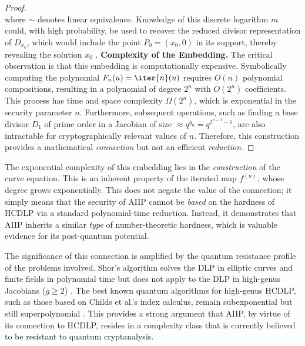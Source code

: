 \begin{proof}
\begin{equation}
                    \end{equation}
                    where \( \sim \) denotes linear equivalence. Knowledge of this discrete logarithm \( m \) could, with high probability, be used to recover the reduced divisor representation of \( D_{x_0} \), which would include the point \( P_0 = (x_0, 0) \) in its support, thereby revealing the solution \( x_0 \) \cite[Section 14.2]{Cohen2010}.
                \textbf{Complexity of the Embedding.}
                    The critical observation is that this embedding is computationally expensive. Symbolically computing the polynomial \( F_n(u) = \iter{n}(u) \) requires \( O(n) \) polynomial compositions, resulting in a polynomial of degree \( 2^n \) with \( O(2^n) \) coefficients. This process has time and space complexity \( \Omega(2^n) \), which is exponential in the security parameter \( n \). Furthermore, subsequent operations, such as finding a base divisor \( D_1 \) of prime order in a Jacobian of size \( \approx q^{g_n} = q^{2^{n-1}-1} \), are also intractable for cryptographically relevant values of \( n \). Therefore, this construction provides a mathematical \emph{connection} but not an efficient \emph{reduction}.
            \end{proof}
            \begin{remark}\label{rm:complexity-remark}
                The exponential complexity of this embedding lies in the \emph{construction} of the curve equation. This is an inherent property of the iterated map \( f^{(n)} \), whose degree grows exponentially. This does not negate the value of the connection; it simply means that the security of AIIP cannot be \emph{based} on the hardness of HCDLP via a standard polynomial-time reduction. Instead, it demonstrates that AIIP inherits a similar \emph{type} of number-theoretic hardness, which is valuable evidence for its post-quantum potential.
            \end{remark}
            \begin{remark}\label{rm:quantum-resistance}
                The significance of this connection is amplified by the quantum resistance profile of the problems involved. Shor's algorithm \cite{Shor1997} solves the DLP in elliptic curves and finite fields in polynomial time but does not apply to the DLP in high-genus Jacobians (\( g \geq 2 \)) \cite{Childs2014}. The best known quantum algorithms for high-genus HCDLP, such as those based on Childs et al.'s index calculus, remain subexponential but still superpolynomial \cite{Childs2014}. This provides a strong argument that AIIP, by virtue of its connection to HCDLP, resides in a complexity class that is currently believed to be resistant to quantum cryptanalysis.
            \end{remark}
